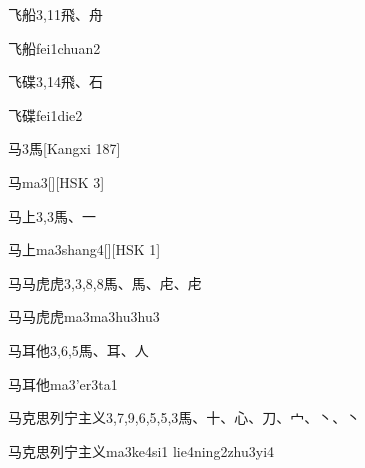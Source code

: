 \begin{entry}{飞船}{3,11}{⾶、⾈}
  \begin{phonetics}{飞船}{fei1chuan2}
  \end{phonetics}
\end{entry}

\begin{entry}{飞碟}{3,14}{⾶、⽯}
  \begin{phonetics}{飞碟}{fei1die2}
  \end{phonetics}
\end{entry}

\begin{entry}{马}{3}{⾺}[Kangxi 187]
  \begin{phonetics}{马}{ma3}[][HSK 3]
  \end{phonetics}
\end{entry}

\begin{entry}{马上}{3,3}{⾺、⼀}
  \begin{phonetics}{马上}{ma3shang4}[][HSK 1]
  \end{phonetics}
\end{entry}

\begin{entry}{马马虎虎}{3,3,8,8}{⾺、⾺、⾌、⾌}
  \begin{phonetics}{马马虎虎}{ma3ma3hu3hu3}
  \end{phonetics}
\end{entry}

\begin{entry}{马耳他}{3,6,5}{⾺、⽿、⼈}
  \begin{phonetics}{马耳他}{ma3'er3ta1}
  \end{phonetics}
\end{entry}

\begin{entry}{马克思列宁主义}{3,7,9,6,5,5,3}{⾺、⼗、⼼、⼑、⼧、⼂、⼂}
  \begin{phonetics}{马克思列宁主义}{ma3ke4si1 lie4ning2zhu3yi4}
  \end{phonetics}
\end{entry}


